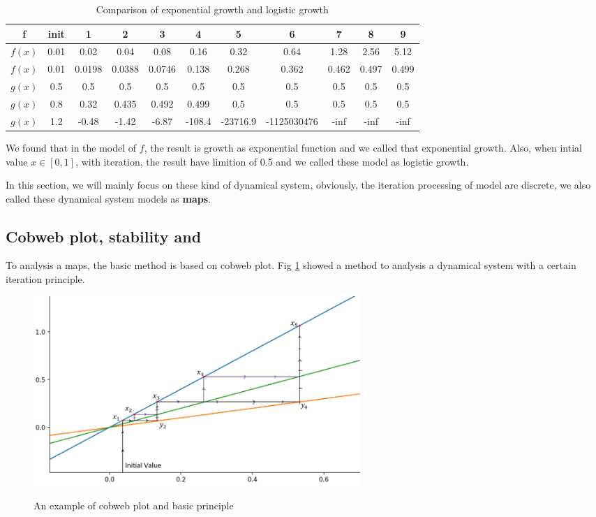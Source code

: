 \documentclass[12pt]{article}
\theoremstyle{plain}
\begin{document}
\begin{table}[H]
\centering  
\caption{Comparison of exponential growth and logistic growth}  
\begin{tabular}{|c||c|c|c|c|c|c|c|c|c|c|}
\hline
f & init & 1 & 2 & 3 & 4 & 5 & 6 & 7 & 8 & 9 \\
\hline
\hline
$f(x)$ & 0.01 & 0.02   & 0.04   & 0.08   & 0.16   & 0.32     & 0.64        & 1.28  & 2.56  & 5.12  \\
\hline
$f(x)$ & 0.01 & 0.0198 & 0.0388 & 0.0746 & 0.138  & 0.268    & 0.362       & 0.462 & 0.497 & 0.499 \\
\hline
$g(x)$ & 0.5  & 0.5    & 0.5    & 0.5    & 0.5    & 0.5      & 0.5         & 0.5   & 0.5   & 0.5   \\
\hline
$g(x)$ & 0.8  & 0.32   & 0.435  & 0.492  & 0.499  & 0.5      & 0.5         & 0.5   & 0.5   & 0.5   \\
\hline
$g(x)$ & 1.2  & -0.48  & -1.42  & -6.87  & -108.4 & -23716.9 & -1125030476 & -inf  & -inf  & -inf  \\
\hline
\end{tabular}  
\end{table}  

We found that in the model of $f$, the result is growth as exponential function and we called that exponential growth. Also, when intial value $x \in [0, 1]$, with iteration, the result have limition of 0.5 and we called these model as logistic growth.

In this section, we will mainly focus on these kind of dynamical system, obviously, the iteration processing of model are discrete, we also called these dynamical system models as \textbf{maps}.






\subsection{Cobweb plot, stability and }
To analysis a maps, the basic method is based on cobweb plot. Fig \ref{cobweb-plow-1} showed a method to analysis a dynamical system with a certain iteration principle. 
\begin{figure}[H]
\begin{center}
\includegraphics[width=0.6\textwidth]{figure/section1/cobweb-plot.png} \\
\caption{An example of cobweb plot and basic principle}\label{cobweb-plow-1}
\end{center}
\end{figure}
\end{document}
